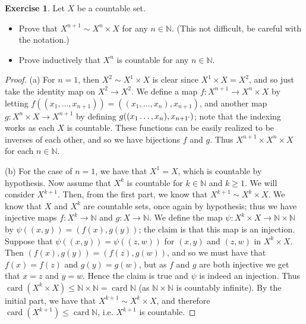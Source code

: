 \documentclass[9pt,reqno]{amsart}
\theoremstyle{definition}
\newtheorem{exercise}{Exercise}[section]
\newcommand{\nn}{\mathbb N}
\DeclareMathOperator{\card}{card}
\begin{document}
\begin{exercise}
	Let $X$ be a countable set.
	\begin{itemize}
		\item [(a)] Prove that $X^{n+1} \sim X^n \times X$ for any $n \in \nn$. (This not difficult, be careful with the notation.)
		\item [(b)] Prove inductively that $X^n$ is countable for any $n \in \nn$.
	\end{itemize}
\end{exercise}
\begin{proof}
	(a) For $n=1$, then $X^2 \sim X^1 \times X$ is clear since $X^1 \times X = X^2$, and so just take the identity map on $X^2 \to X^2$. We define a map $f\colon X^{n+1} \to X^n \times X$ by letting $f( (x_1, \ldots, x_{n+1}))= ((x_1, \ldots, x_n), x_{n+1})$, and another map $g \colon X^n \times X \to X^{n+1}$ by defining $g((x_1\ldots, x_n), x_{n+1`})$; note that the indexing works as each $X$ is countable. These functions can be easily realized to be inverses of each other, and so we have bijections $f$ and $g$. Thus $X^{n+1} \times X^n \times X$ for each $n \in \nn$.
	
	(b) For the case of $n=1$, we have that $X^1 = X$, which is countable by hypothesis. Now assume that $X^k$ is countable for $k \in \nn$ and $k \geq 1$. We will consider $X^{k+1}$. Then, from the first part, we know that $X^{k+1} \sim X^k \times X$. We know that $X$ and $X^k$ are countable sets, once again by hypothesis; thus we have injective maps $f \colon X^k \to \nn$ and $g \colon X \to \nn$. We define the map $\psi \colon X^k \times X \to \nn \times \nn$ by $\psi ((x,y)) = (f(x), g(y))$; the claim is that this map is an injection. Suppose that $\psi ((x,y)) = \psi ((z,w))$ for $(x,y)$ and $(z,w)$ in $X^k \times X$. Then $(f(x), g(y)) = (f(z), g(w))$, and so we must have that $f(x) = f(z)$ and $g(y) = g(w)$, but as $f$ and $g$ are both injective we get that $x=z$ and $y=w$. Hence the claim is true and $\psi$ is indeed an injection. Thus $\card (X^k \times X) \leq \nn \times \nn = \card \nn$ (as $\nn \times \nn$ is countably infinite). By the initial part, we have that $X^{k+1} \sim X^k \times X$, and therefore $\card(X^{k+1}) \leq \card\nn$, i.e. $X^{k+1}$ is countable. 
\end{proof}
\end{document}

